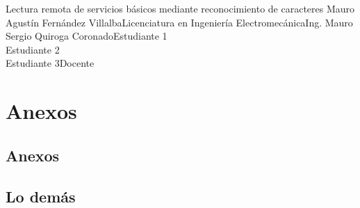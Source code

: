 \documentclass{upb_class}
\begin{document}
\frontmatter
	\begin{caratula}{Lectura remota de servicios básicos mediante reconocimiento de caracteres}
		{Mauro Agustín Fernández Villalba}{Licenciatura en Ingeniería Electromecánica}{Ing. Mauro Sergio Quiroga Coronado}{Estudiante 1 \\ Estudiante 2 \\ Estudiante 3}{Docente}
	\end{caratula}




	\newpage 
	\tableofcontents
	\listoffigures
	\listoftables

\mainmatter

	





\newpage
	
	
\appendix
\chapter{Anexos}
\section*{Anexos}
\appendix
\begin{appendices}
	\section{Lo demás}
	\end{appendices}
\end{document}
